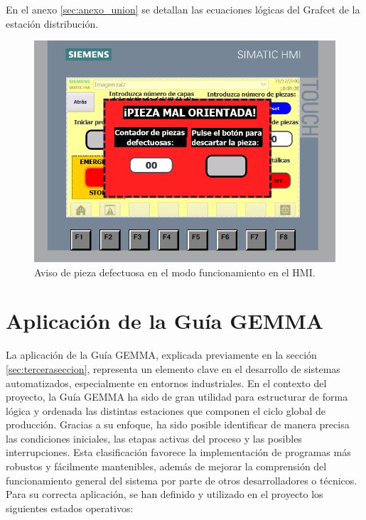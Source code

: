 En el anexo \ref{sec:anexo_union} se detallan las ecuaciones lógicas del Grafcet de la estación distribución.

\clearpage

\begin{figure}[h!]
  \includegraphics[width=15cm]{figs/HMI_descarte}
  \caption{\centering Aviso de pieza defectuosa en el modo funcionamiento en el HMI.}
  \label{fig:HMI_descarte}
\end{figure}

\section{Aplicación de la Guía GEMMA}
\label{sec:aplicacion_gemma}

La aplicación de la Guía GEMMA, explicada previamente en la sección \ref{sec:terceraseccion}, representa un elemento clave en el desarrollo de sistemas automatizados, especialmente en entornos industriales. En el contexto del proyecto, la Guía GEMMA ha sido de gran utilidad para estructurar de forma lógica y ordenada las distintas estaciones que componen el ciclo global de producción. Gracias a su enfoque, ha sido posible identificar de manera precisa las condiciones iniciales, las etapas activas del proceso y las posibles interrupciones. Esta clasificación favorece la implementación de programas más robustos y fácilmente mantenibles, además de mejorar la comprensión del funcionamiento general del sistema por parte de otros desarrolladores o técnicos. Para su correcta aplicación, se han definido y utilizado en el proyecto los siguientes estados operativos:


